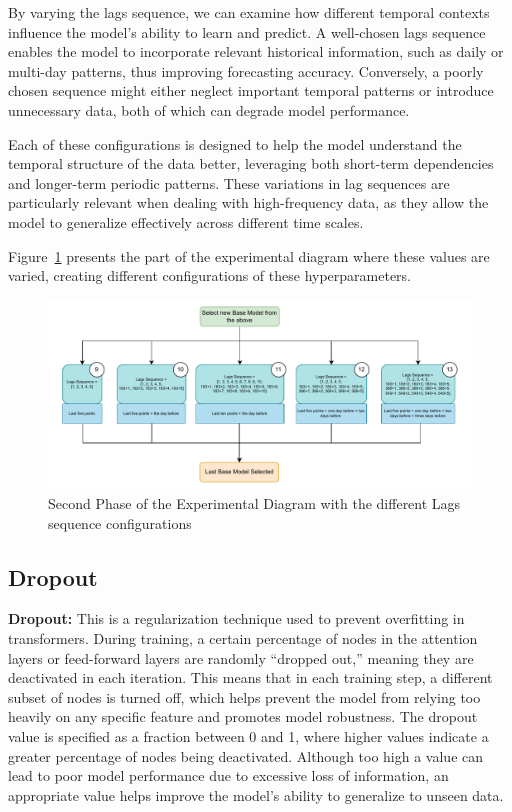 By varying the lags sequence, we can examine how different temporal contexts influence the model's ability to learn and predict. A well-chosen lags sequence enables the model to incorporate relevant historical information, such as daily or multi-day patterns, thus improving forecasting accuracy. Conversely, a poorly chosen sequence might either neglect important temporal patterns or introduce unnecessary data, both of which can degrade model performance.

Each of these configurations is designed to help the model understand the temporal structure of the data better, leveraging both short-term dependencies and longer-term periodic patterns. These variations in lag sequences are particularly relevant when dealing with high-frequency data, as they allow the model to generalize effectively across different time scales.

Figure~\ref{D2} presents the part of the experimental diagram where these values are varied, creating different configurations of these hyperparameters.

\begin{figure}[htbp]
    \centering
    \includegraphics[width=15 cm]{5_ChapterDesign/figuras/Diagrams/D2.pdf}
    \caption{Second Phase of the Experimental Diagram with the different Lags sequence configurations}
    \label{D2}
\end{figure}


\subsection{Dropout}
\textbf{Dropout:}  This is a regularization technique used to prevent overfitting in transformers. During training, a certain percentage of nodes in the attention layers or feed-forward layers are randomly “dropped out,” meaning they are deactivated in each iteration. This means that in each training step, a different subset of nodes is turned off, which helps prevent the model from relying too heavily on any specific feature and promotes model robustness. The dropout value is specified as a fraction between 0 and 1, where higher values indicate a greater percentage of nodes being deactivated. Although too high a value can lead to poor model performance due to excessive loss of information, an appropriate value helps improve the model’s ability to generalize to unseen data.

